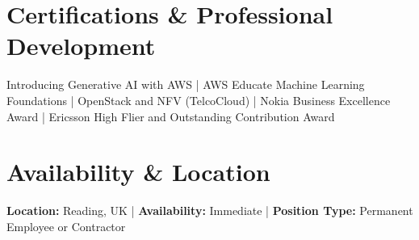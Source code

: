\documentclass[10pt,a4paper]{article}
\begin{document}
\vspace{2pt}

\section*{Certifications \& Professional Development}
Introducing Generative AI with AWS | AWS Educate Machine Learning Foundations | OpenStack and NFV (TelcoCloud) | Nokia Business Excellence Award | Ericsson High Flier and Outstanding Contribution Award

\vspace{2pt}

\section*{Availability \& Location}
\textbf{Location:} Reading, UK | \textbf{Availability:} Immediate | \textbf{Position Type:} Permanent Employee or Contractor
\end{document}
